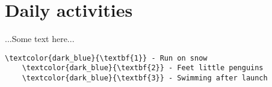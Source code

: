 \chapter*{Daily activities}

...Some text here...

\vspace{5mm}
\begin{Verbatim}[frame=single,framesep=1mm,fontfamily=courier,fontsize=\scriptsize, commandchars=\\\{\}, label={\textcolor{dark_blue}{Activities}}]
    \textcolor{dark_blue}{\textbf{1}} - Run on snow
    \textcolor{dark_blue}{\textbf{2}} - Feet little penguins
    \textcolor{dark_blue}{\textbf{3}} - Swimming after launch
\end{Verbatim}

\vspace{5mm}

